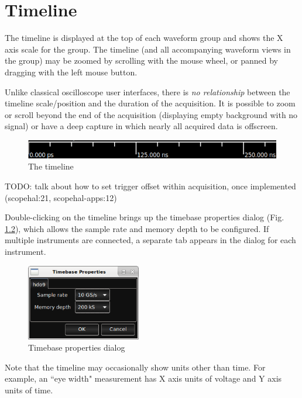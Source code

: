 \chapter{Timeline}

The timeline is displayed at the top of each waveform group and shows the X axis scale for the group. The timeline (and
all accompanying waveform views in the group) may be zoomed by scrolling with the mouse wheel, or panned by dragging
with the left mouse button.

Unlike classical oscilloscope user interfaces, there is \emph{no relationship} between the timeline scale/position and
the duration of the acquisition. It is possible to zoom or scroll beyond the end of the acquisition (displaying empty
background with no signal) or have a deep capture in which nearly all acquired data is offscreen.

\begin{figure}[h]
\centering
\includegraphics[width=13cm]{images/timeline.png}
\caption{The timeline}
\label{timeline}
\end{figure}

TODO: talk about how to set trigger offset within acquisition, once implemented (scopehal:21, scopehal-apps:12)

Double-clicking on the timeline brings up the timebase properties dialog (Fig. \ref{timebase-properties}), which allows
the sample rate and memory depth to be configured. If multiple instruments are connected, a separate tab appears in the
dialog for each instrument.

\begin{figure}[h]
\centering
\includegraphics[width=5cm]{images/timebase-properties.png}
\caption{Timebase properties dialog}
\label{timebase-properties}
\end{figure}


Note that the timeline may occasionally show units other than time. For example, an ``eye width" measurement has X axis
units of voltage and Y axis units of time.
